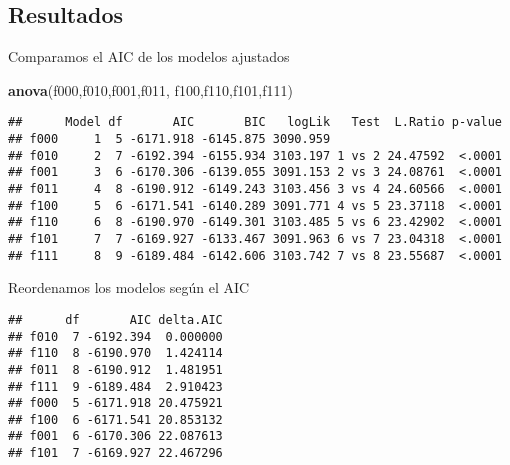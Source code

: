 \documentclass[]{article}
\newenvironment{Shaded}{\begin{snugshade}}{\end{snugshade}}
\newcommand{\DataTypeTok}[1]{\textcolor[rgb]{0.13,0.29,0.53}{#1}}
\newcommand{\DecValTok}[1]{\textcolor[rgb]{0.00,0.00,0.81}{#1}}
\newcommand{\KeywordTok}[1]{\textcolor[rgb]{0.13,0.29,0.53}{\textbf{#1}}}
\newcommand{\NormalTok}[1]{#1}
\newcommand{\OperatorTok}[1]{\textcolor[rgb]{0.81,0.36,0.00}{\textbf{#1}}}
\newcommand{\StringTok}[1]{\textcolor[rgb]{0.31,0.60,0.02}{#1}}
\begin{document}
\hypertarget{resultados}{%
\subsection{Resultados}\label{resultados}}

Comparamos el AIC de los modelos ajustados

\begin{Shaded}
\begin{Highlighting}[]
\KeywordTok{anova}\NormalTok{(f000,f010,f001,f011,}
\NormalTok{  f100,f110,f101,f111)}
\end{Highlighting}
\end{Shaded}

\begin{verbatim}
##      Model df       AIC       BIC   logLik   Test  L.Ratio p-value
## f000     1  5 -6171.918 -6145.875 3090.959                        
## f010     2  7 -6192.394 -6155.934 3103.197 1 vs 2 24.47592  <.0001
## f001     3  6 -6170.306 -6139.055 3091.153 2 vs 3 24.08761  <.0001
## f011     4  8 -6190.912 -6149.243 3103.456 3 vs 4 24.60566  <.0001
## f100     5  6 -6171.541 -6140.289 3091.771 4 vs 5 23.37118  <.0001
## f110     6  8 -6190.970 -6149.301 3103.485 5 vs 6 23.42902  <.0001
## f101     7  7 -6169.927 -6133.467 3091.963 6 vs 7 23.04318  <.0001
## f111     8  9 -6189.484 -6142.606 3103.742 7 vs 8 23.55687  <.0001
\end{verbatim}

Reordenamos los modelos según el AIC

\begin{Shaded}
\end{Shaded}

\begin{verbatim}
##      df       AIC delta.AIC
## f010  7 -6192.394  0.000000
## f110  8 -6190.970  1.424114
## f011  8 -6190.912  1.481951
## f111  9 -6189.484  2.910423
## f000  5 -6171.918 20.475921
## f100  6 -6171.541 20.853132
## f001  6 -6170.306 22.087613
## f101  7 -6169.927 22.467296
\end{verbatim}
\end{document}
